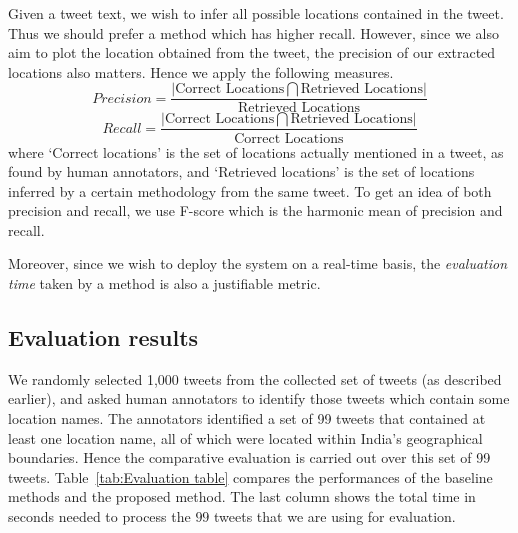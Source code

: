 Given a tweet text, we wish to infer all possible locations contained in the tweet. Thus we should prefer a method which has higher recall. However, since we also aim to plot the location obtained from the tweet, the precision of our extracted locations also matters. Hence we apply the following measures.
\begin{equation}
Precision =\frac{\left | \mbox{Correct Locations} \bigcap \mbox{Retrieved Locations}  \right |}{ \mbox{Retrieved Locations}}
\end{equation}
\begin{equation}
Recall =\frac{\left | \mbox{Correct Locations} \bigcap \mbox{Retrieved Locations}  \right |}{ \mbox{Correct Locations}}
\end{equation}
where `Correct locations' is the set of locations actually mentioned in a tweet, as found by human annotators, and
`Retrieved locations' is the set of locations inferred by a certain methodology from the same tweet.
To get an idea of both precision and recall, we use F-score which is the harmonic mean of precision and recall.

Moreover, since we wish to deploy the system on a real-time basis, the {\it evaluation time} taken by a method is also a justifiable metric.



\subsection{Evaluation results}

We randomly selected 1,000 tweets from the collected set of tweets (as described earlier), and asked human annotators to identify those tweets which contain some location names.
The annotators identified a set of 99 tweets that contained at least one location name, all of which were located within India's geographical boundaries. Hence the comparative evaluation is carried out over this set of 99 tweets.
Table~\ref{tab:Evaluation table} compares the performances of the baseline methods and the proposed method.
The last column shows the total time in seconds needed to process the $99$ tweets that we are using for evaluation.


